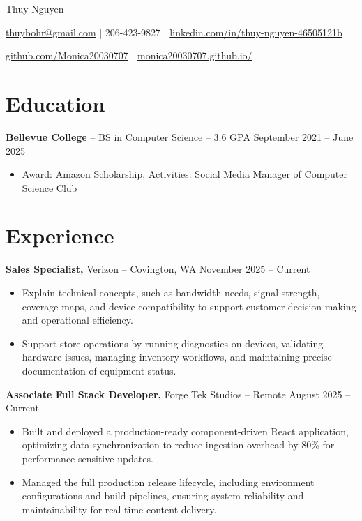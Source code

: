 \documentclass[11pt]{article}       %
\begin{document}
\centerline{\Huge Thuy Nguyen}

\vspace{5pt}

\centerline{\href{mailto:thuybohr@gmail.com}{thuybohr@gmail.com} | 206-423-9827 |
\href{https://www.linkedin.com/in/thuy-nguyen-46505121b/}{linkedin.com/in/thuy-nguyen-46505121b}}

\centerline{\href{https://github.com/Monica20030707}{github.com/Monica20030707} | 
\href{https://monica20030707.github.io/}{monica20030707.github.io/}} 

\vspace{-9pt}

\section*{Education}
\textbf{Bellevue College} -- BS in Computer Science -- 3.6 GPA \hfill September 2021 -- June 2025\\
\vspace{-9pt}
\begin{itemize}
  \item Award: Amazon Scholarship, Activities: Social Media Manager of Computer Science Club
\end{itemize}

\vspace{-18.5pt}

\section*{Experience}

\textbf{Sales Specialist,} {Verizon} -- Covington, WA \hfill November 2025 -- Current \\
\vspace{-9pt}
\begin{itemize}
  \item Explain technical concepts, such as bandwidth needs, signal strength, coverage maps, and device compatibility to support customer decision-making and operational efficiency.
  \item Support store operations by running diagnostics on devices, validating hardware issues, managing inventory workflows, and maintaining precise documentation of equipment status.
\end{itemize}

\textbf{Associate Full Stack Developer,} {Forge Tek Studios} -- Remote \hfill August 2025 -- Current 
\vspace{-9pt}
\begin{itemize}
  \item Built and deployed a production-ready component-driven React application, optimizing data synchronization to reduce ingestion overhead by 80\% for performance-sensitive updates.
  \item Managed the full production release lifecycle, including environment configurations and build pipelines, ensuring system reliability and maintainability for real-time content delivery.
\end{itemize}
\end{document}
